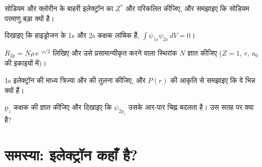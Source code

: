 \begin{exercise}[$\star\star$]\label{exo:b2:atomic-orbitals:8}
सोडियम और क्लोरीन के बाहरी इलेक्ट्रॉन का $Z^*$ और  परिकलित कीजिए,
और समझाइए कि सोडियम परमाणु बड़ा क्यों है।
\end{exercise}

\begin{exercise}[$\star\star$]\label{exo:b2:atomic-orbitals:9}
दिखाइए कि हाइड्रोजन के 1s और 2s कक्षक लांबिक हैं,
$\int\psi_{1s}\psi_{2s}\,dV = 0$।
\end{exercise}

\begin{exercise}[$\star\star\star$]\label{exo:b2:atomic-orbitals:10}
$R_{2p} = N\rho\,\mathrm e^{-\rho/2}$ लिखिए और उसे प्रसामान्यीकृत करने वाला स्थिरांक $N$ ज्ञात कीजिए
($Z = 1$, $r$, $a_0$ की इकाइयों में)।
\end{exercise}

\begin{exercise}[$\star\star\star$]\label{exo:b2:atomic-orbitals:11}
1s इलेक्ट्रॉन की माध्य त्रिज्या और  की तुलना कीजिए, और
$P(r)$ की आकृति से समझाइए कि वे भिन्न क्यों हैं।
\end{exercise}

\begin{exercise}[$\star\star\star$]\label{exo:b2:atomic-orbitals:12}
$\mathrm p_z$ कक्षक की  ज्ञात कीजिए और दिखाइए कि $\psi_{2p_z}$
उसके आर-पार चिह्न बदलता है। उस सतह पर  क्या है?
\end{exercise}

\section{समस्या: इलेक्ट्रॉन कहाँ है?}

